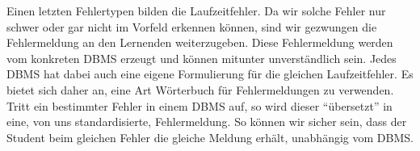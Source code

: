 Einen letzten Fehlertypen bilden die Laufzeitfehler. Da wir solche Fehler nur schwer oder gar nicht im Vorfeld erkennen können, sind wir gezwungen die Fehlermeldung an den Lernenden weiterzugeben. Diese Fehlermeldung werden vom konkreten DBMS erzeugt und können mitunter unverständlich sein. Jedes DBMS hat dabei auch eine eigene Formulierung für die gleichen Laufzeitfehler. Es bietet sich daher an, eine Art Wörterbuch für Fehlermeldungen zu verwenden. Tritt ein bestimmter Fehler in einem DBMS auf, so wird dieser "`übersetzt"' in eine, von uns standardisierte, Fehlermeldung. So können wir sicher sein, dass der Student beim gleichen Fehler die gleiche Meldung erhält, unabhängig vom DBMS.